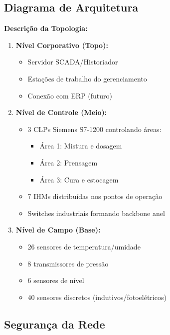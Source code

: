 \documentclass[12pt,a4paper]{article}
\begin{document}
\subsection{Diagrama de Arquitetura}

\textbf{Descrição da Topologia:}

\begin{enumerate}
    \item \textbf{Nível Corporativo (Topo):}
    \begin{itemize}
        \item Servidor SCADA/Historiador
        \item Estações de trabalho do gerenciamento
        \item Conexão com ERP (futuro)
    \end{itemize}

    \item \textbf{Nível de Controle (Meio):}
    \begin{itemize}
        \item 3 CLPs Siemens S7-1200 controlando áreas:
        \begin{itemize}
            \item Área 1: Mistura e dosagem
            \item Área 2: Prensagem
            \item Área 3: Cura e estocagem
        \end{itemize}
        \item 7 IHMs distribuídas nos pontos de operação
        \item Switches industriais formando backbone anel
    \end{itemize}

    \item \textbf{Nível de Campo (Base):}
    \begin{itemize}
        \item 26 sensores de temperatura/umidade
        \item 8 transmissores de pressão
        \item 6 sensores de nível
        \item 40 sensores discretos (indutivos/fotoelétricos)
    \end{itemize}
\end{enumerate}

\subsection{Segurança da Rede}
\end{document}
